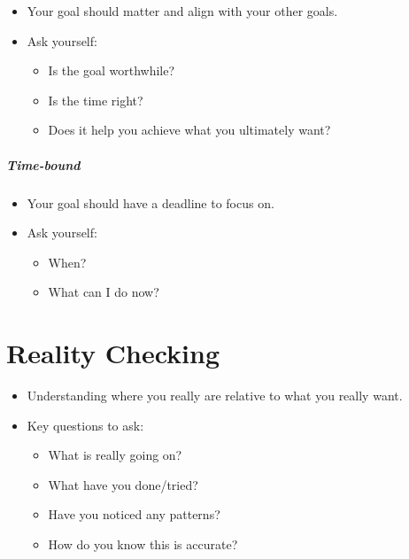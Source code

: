 \documentclass[
]{book}
\providecommand{\tightlist}{%
  \setlength{\itemsep}{0pt}\setlength{\parskip}{0pt}}
\begin{document}
\begin{itemize}
\tightlist
\item
  Your goal should matter and align with your other
  goals.
\item
  Ask yourself:

  \begin{itemize}
  \tightlist
  \item
    Is the goal worthwhile?
  \item
    Is the time right?
  \item
    Does it help you achieve what you ultimately want?
  \end{itemize}
\end{itemize}

\hypertarget{time-bound}{%
\subparagraph*{Time-bound}\label{time-bound}}

\begin{itemize}
\tightlist
\item
  Your goal should have a deadline to focus on.
\item
  Ask yourself:

  \begin{itemize}
  \tightlist
  \item
    When?
  \item
    What can I do now?
  \end{itemize}
\end{itemize}

\hypertarget{reality-checking}{%
\section*{Reality Checking}\label{reality-checking}}

\begin{itemize}
\tightlist
\item
  Understanding where you really are relative to what
  you really want.
\item
  Key questions to ask:

  \begin{itemize}
  \tightlist
  \item
    What is really going on?
  \item
    What have you done/tried?
  \item
    Have you noticed any patterns?
  \item
    How do you know this is accurate?
  \end{itemize}
\end{itemize}
\end{document}
